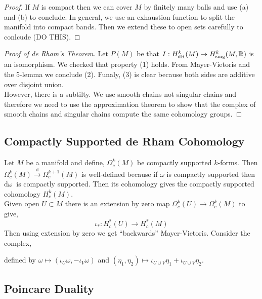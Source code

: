 \documentclass[12pt]{extarticle}
\newcommand{\R}{\mathbb{R}}
\renewcommand{\d}[1]{ \mathrm{d}#1 \:}
\theoremstyle{definition}
\begin{document}
\begin{proof}
If $M$ is compact then we can cover $M$ by finitely many balls and use  (a) and (b) to conclude. In general, we use an exhaustion function to split the manifold into compact bands. Then we extend these to open sets carefully to conlcude (DO THIS).
\end{proof}

\begin{proof}[Proof of de Rham's Theorem]
Let $P(M)$ be that $I : H^k_{\dR}(M) \to H^k_{\text{sing}}(M, \R)$ is an isomorphism. We checked that property (1) holds. From Mayer-Vietoris and the 5-lemma we conclude (2). Funaly, (3) is clear because both sides are additive over disjoint union.
\bigskip\\
However, there is a subtilty. We use smooth chains not singular chains and therefore we need to use the approximation theorem to show that the complex of smooth chains and singular chains compute the same cohomology groups.  
\end{proof}

\subsection{Compactly Supported de Rham Cohomology}

Let $M$ be a manifold and define, $\Omega^k_c(M)$ be compactly supported $k$-forms. Then $\Omega^k_c(M) \xrightarrow{\mathrm{d}} \Omega^{k+1}_c(M)$ is well-defined because if $\omega$ is compactly supported then $\d{\omega}$ is compactly supported. Then its cohomology gives the compactly supported cohomology $H^k_c(M)$.
\bigskip\\
Given open $U \subset M$ there is an extension by zero map $\Omega^k_c(U) \to \Omega^k_c(M)$ to give,
\[ \iota_* : H^*_c(U) \to H^*_c(M) \]
Then using extension by zero we get ``backwards'' Mayer-Vietoris. Consider the complex,
\begin{center}
\end{center}
defined by $\omega \mapsto (\iota_U \omega, - \iota_V \omega)$ and $(\eta_1, \eta_2) \mapsto \iota_{U \cup V} \eta_1 + \iota_{U \cup V} \eta_2$.

\subsection{Poincare Duality}
\end{document}
